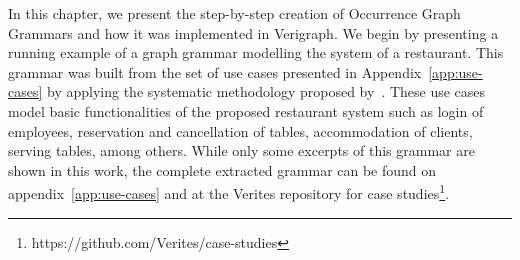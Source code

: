 In this chapter, we present the step-by-step creation of Occurrence Graph Grammars and how it was implemented in Verigraph. We begin by presenting a running example of a graph grammar modelling the system of a restaurant. This grammar was built from the set of use cases presented in Appendix~\ref{app:use-cases} by applying the systematic methodology proposed by~\cite{Junior2015}. These use cases model basic functionalities of the proposed restaurant system such as login of employees, reservation and cancellation of tables, accommodation of clients, serving tables, among others. While only some excerpts of this grammar are shown in this work, the complete extracted grammar can be found on appendix~\ref{app:use-cases} and at the Verites repository for case studies\footnote{https://github.com/Verites/case-studies}.

